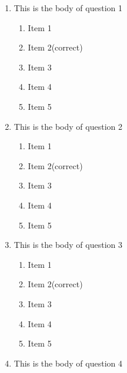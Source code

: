\documentclass[amsfonts,bezier,leqno,fleqn,12pt,a4paper]{article}
\begin{document}
\newpage


\renewcommand{\thepage}{\noindent Term Term 212, MATH101, Final Exam \hfill Page {\bf \arabic{page} of 5 } \hfill {\bf \fbox{ MASTER }}}
\setcounter{page}{1}


\begin{large}
\begin{enumerate}

\item This is the body of question 1
\vspace {0.3in}
\setcounter{equation}{0}

\begin{enumerate}
\item Item 1
\item Item 2\hfill {\small (correct)}
\item Item 3
\item Item 4
\item Item 5

\end{enumerate}

\vspace {3.5cm}


\item This is the body of question 2
\vspace {0.3in}
\setcounter{equation}{0}

\begin{enumerate}
\item Item 1
\item Item 2\hfill {\small (correct)}
\item Item 3
\item Item 4
\item Item 5

\end{enumerate}
\newpage


\item This is the body of question 3
\vspace {0.3in}
\setcounter{equation}{0}

\begin{enumerate}
\item Item 1
\item Item 2\hfill {\small (correct)}
\item Item 3
\item Item 4
\item Item 5

\end{enumerate}

\vspace {3.5cm}


\item This is the body of question 4
\vspace {0.3in}
\setcounter{equation}{0}


\end{enumerate}
\end{large}
\end{document}
